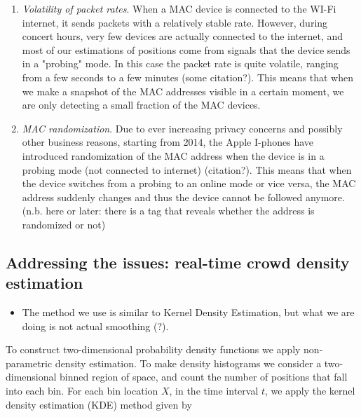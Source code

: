 \documentclass[10pt,a4paper]{article}
\begin{document}
\begin{enumerate}
\item {\it Volatility of packet rates}. When a MAC device is connected to the WI-Fi internet, it sends packets with a relatively stable rate. However, during concert hours, very few devices are actually connected to the internet, and most of our estimations of positions come from signals that the device sends in a "probing" mode. In this case the packet rate is quite volatile, ranging from a few seconds to a few minutes (some citation?). This means that when we make a snapshot of the MAC addresses visible in a certain moment, we are only detecting a small fraction of the MAC devices.   

\item {\it MAC randomization}. Due to ever increasing privacy concerns and possibly other business reasons, starting from 2014, the Apple I-phones have introduced randomization of the MAC address when the device is in a probing mode (not connected to internet) (citation?). This means that when the device switches from a probing to an online mode or vice versa, the MAC address suddenly changes and thus the device cannot be followed anymore. (n.b. here or later: there is a tag that reveals whether the address is randomized or not)    
\end{enumerate}


\subsection{Addressing the issues: real-time crowd density estimation}

\begin{itemize}
\item The method we use is similar to Kernel Density Estimation, but what we are doing is not actual smoothing (?).
\end{itemize}

To construct two-dimensional probability density functions we apply non-parametric density estimation.
To make density histograms we consider a two-dimensional binned region of space, and count the number of positions that fall into each bin. For each bin location $X$, in the time interval $t$, we apply the kernel density estimation (KDE) method \cite{scott}\cite{silverman} given by
\end{document}
